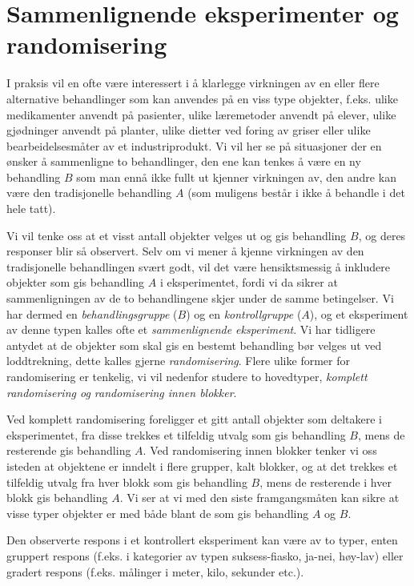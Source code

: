 \section{Sammenlignende eksperimenter og randomisering}
I praksis vil en ofte være interessert i å klarlegge virkningen
av en eller flere alternative behandlinger som kan anvendes på en
viss type objekter, f.eks. ulike medikamenter anvendt på pasienter,
ulike læremetoder anvendt på elever, ulike gjødninger anvendt
på planter, ulike dietter ved foring av griser eller ulike 
bearbeidelsesmåter av et industriprodukt.  Vi vil her se på
situasjoner der en ønsker å sammenligne to behandlinger, den ene
kan tenkes å være en ny behandling $B$ som man ennå ikke
fullt ut kjenner virkningen av, den andre kan være den tradisjonelle
behandling $A$ (som muligens består i ikke å behandle i det hele tatt).

  Vi vil tenke oss at et visst antall objekter velges ut og 
gis behandling $B$, og deres responser blir så observert.  Selv om
vi mener å kjenne virkningen av den tradisjonelle behandlingen
svært godt, vil det være hensiktsmessig å inkludere objekter
som gis behandling $A$ i eksperimentet, fordi vi da sikrer at sammenligningen
av de to behandlingene skjer under de samme betingelser.  Vi har dermed
en {\em behandlingsgruppe} ($B$) og en {\em kontrollgruppe} ($A$), og et
eksperiment av denne typen kalles ofte et {\em sammenlignende eksperiment}.
Vi har tidligere antydet at de objekter som skal gis en bestemt behandling
bør velges ut ved loddtrekning, dette kalles gjerne {\em randomisering}.
Flere ulike former for randomisering er tenkelig, vi vil nedenfor studere
to hovedtyper, {\em komplett randomisering og randomisering innen blokker}.

Ved komplett randomisering foreligger et gitt antall objekter som
del\-ta\-kere i eksperimentet, fra disse trekkes et tilfeldig utvalg som gis
behandling $B$, mens de resterende gis behandling $A$.  Ved 
randomisering innen blokker tenker vi oss isteden at objektene er inndelt
i flere grupper, kalt blokker, og at det trekkes et tilfeldig utvalg fra
hver blokk som gis behandling $B$, mens de resterende i hver blokk gis
behandling $A$.  Vi ser at vi med den siste framgangsmåten kan sikre at
visse typer objekter er med både blant de som gis behandling $A$ og $B$.

Den observerte respons i et kontrollert eksperiment kan være av to
typer, enten gruppert respons (f.eks. i kategorier av typen 
suksess-fiasko, ja-nei, høy-lav) eller gradert respons (f.eks.
målinger i meter, kilo, sekunder etc.).

